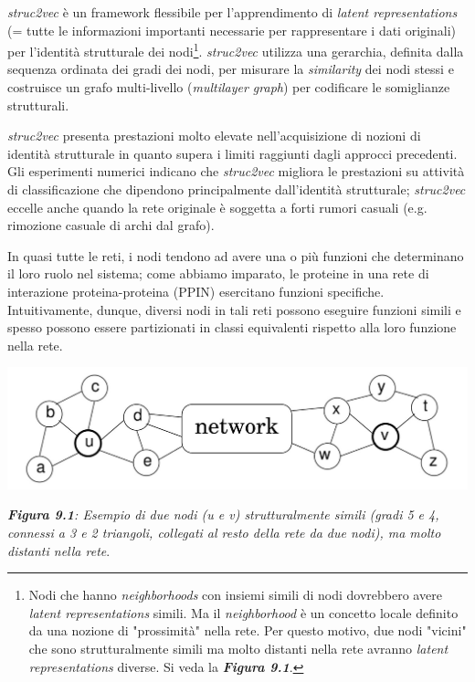 \documentclass[11pt]{article}
\begin{document}
\textit{struc2vec} è un framework flessibile per l'apprendimento di \textit{latent representations} (= tutte le informazioni importanti necessarie per rappresentare i dati originali) per l'identità strutturale dei nodi\footnote{Nodi che hanno \textit{neighborhoods} con insiemi simili di nodi dovrebbero avere \textit{latent representations} simili. Ma il \textit{neighborhood} è un concetto locale definito da una nozione di "prossimità" nella rete. Per questo motivo, due nodi "vicini" che sono strutturalmente simili ma molto distanti nella rete avranno \textit{latent representations} diverse. Si veda la \textit{\textbf{Figura 9.1}}.}. \textit{struc2vec} utilizza una gerarchia, definita dalla sequenza ordinata dei gradi dei nodi, per misurare la \textit{similarity} dei nodi stessi e costruisce un grafo multi-livello (\textit{multilayer graph}) per codificare le somiglianze strutturali.

\textit{struc2vec} presenta prestazioni molto elevate nell'acquisizione di nozioni di identità strutturale in quanto supera i limiti raggiunti dagli approcci precedenti. Gli esperimenti numerici indicano che \textit{struc2vec} migliora le prestazioni su attività di classificazione che dipendono principalmente dall'identità strutturale; \textit{struc2vec} eccelle anche quando la rete originale è soggetta a forti rumori casuali (e.g. rimozione casuale di archi dal grafo).

In quasi tutte le reti, i nodi tendono ad avere una o più funzioni che determinano il loro ruolo nel sistema; come abbiamo imparato, le proteine in una rete di interazione proteina-proteina (PPIN) esercitano funzioni specifiche. 
Intuitivamente, dunque, diversi nodi in tali reti possono eseguire funzioni simili e spesso possono essere partizionati in classi equivalenti rispetto alla loro funzione nella rete.

\begin{center}
\includegraphics[scale=0.36]{struc1}

\begin{small}\textit{\textbf{Figura 9.1}: Esempio di due nodi (u e v) strutturalmente simili (gradi 5 e 4, connessi a 3 e 2 triangoli, collegati al resto della rete da due nodi), ma molto distanti nella rete}.\end{small}
\end{center}
\end{document}
